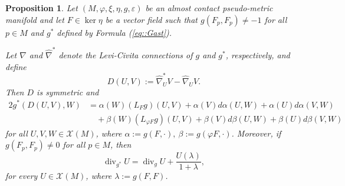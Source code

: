 \documentclass[12pt,a4paper,final]{amsart}
\numberwithin{equation}{section}
\newtheorem{stw}[tw]{Proposition}
\theoremstyle{df}
\newcommand{\X}{\mathcal{X}}
\newcommand{\XM}{\X(M)}
\newcommand{\eps}{\varepsilon}
\begin{document}
\begin{stw}\label{stw::difference}
Let $(M,\varphi,\xi,\eta,g,\eps)$ be an almost contact pseudo-metric manifold
and let $F\in\ker\eta$ be a vector field such that $g(F_p,F_p)\neq -1$ for all $p\in M$ and $g^\ast$ defined by Formula (\ref{eq::Gast}).

Let $\widehat{\nabla}$ and $\widehat{\nabla}^\ast$ denote the Levi-Civita
connections of $g$ and $g^\ast$, respectively, and define
$$
D(U,V):=\widehat{\nabla}^\ast_U V-\widehat{\nabla}_U V.
$$
Then $D$ is symmetric and
\begin{equation}\label{eq::difference}
\begin{aligned}
2g^\ast(D(U,V),W)
&=\alpha(W)(L_Fg)(U,V)+\alpha(V)d\alpha(U,W)+\alpha(U)d\alpha(V,W)\\
&\quad+\beta(W)(L_{\varphi F}g)(U,V)
+\beta(V)d\beta(U,W)+\beta(U)d\beta(V,W)
\end{aligned}
\end{equation}
for all $U,V,W\in\XM$, where 
$\alpha:=g(F,\cdot),\ \beta:=g(\varphi F,\cdot)
$.
Moreover, if $g(F_p,F_p)\neq 0$ for all $p\in M$, then
\begin{equation}\label{eq::divergence}
\operatorname{div}_{g^\ast}U=\operatorname{div}_gU+\frac{U(\lambda)}{1+\lambda},
\end{equation}
for every $U\in\XM$, where $\lambda:=g(F,F)$.
\end{stw}
\end{document}

